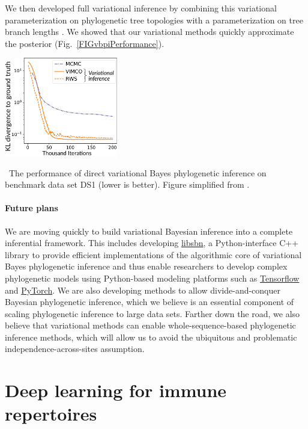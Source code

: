 \documentclass[nobib]{tufte-handout}
\begin{document}
We then developed full variational inference by combining this variational parameterization on phylogenetic tree topologies with a parameterization on tree branch lengths \cite{Zhang2018-lw}.
We showed that our variational methods quickly approximate the posterior (Fig.~\ref{FIGvbpiPerformance}).

\begin{marginfigure}[0.7in]%
  \includegraphics[width=1.95in]{vbpi-performance}
  \caption{\
    The performance of direct variational Bayes phylogenetic inference on benchmark data set DS1 (lower is better).
    Figure simplified from \cite{Zhang2018-lw}.
    }
  \label{FIGvbpiPerformance}
\end{marginfigure}%

\paragraph{Future plans}
We are moving quickly to build variational Bayesian inference into a complete inferential framework.
This includes developing \href{https://github.com/phylovi/libsbn/}{libsbn}, a Python-interface C++ library to provide efficient implementations of the algorithmic core of variational Bayes phylogenetic inference and thus enable researchers to develop complex phylogenetic models using Python-based modeling platforms such as \href{https://www.tensorflow.org/}{Tensorflow} and \href{https://pytorch.org/}{PyTorch}.
We are also developing methods to allow divide-and-conquer Bayesian phylogenetic inference, which we believe is an essential component of scaling phylogenetic inference to large data sets.
Farther down the road, we also believe that variational methods can enable whole-sequence-based phylogenetic inference methods, which will allow us to avoid the ubiquitous and problematic independence-across-sites assumption.


\vspace{0.3cm}
\section{Deep learning for immune repertoires}
\vspace{-0.3cm}
\end{document}
